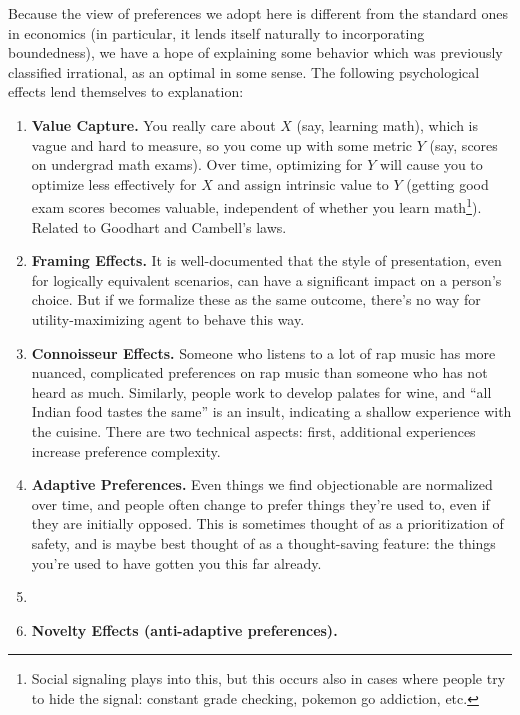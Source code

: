 \documentclass{article}
\begin{document}
	Because the view of preferences we adopt here is different from the standard ones in economics (in particular, it lends itself naturally to incorporating boundedness), we have a hope of explaining some behavior which was previously classified irrational, as an optimal in some sense. The following psychological effects lend themselves to explanation:
	\begin{enumerate}[noitemsep]
		\item \textbf{Value Capture.} You really care about $X$ (say, learning math), which is vague and hard to measure, so you come up with some metric $Y$ (say, scores on undergrad math exams). Over time, optimizing for $Y$ will cause you to optimize less effectively for $X$ and assign intrinsic value to $Y$ (getting good exam scores becomes valuable, independent of whether you learn math\footnote{Social signaling plays into this, but this occurs also in cases where people try to hide the signal: constant grade checking, pokemon go addiction, etc.}). Related to Goodhart and Cambell's laws.
		\item \textbf{Framing Effects.} It is well-documented that the style of presentation, even for logically equivalent scenarios, can have a significant impact on a person's choice. But if we formalize these as the same outcome, there's no way for utility-maximizing agent to behave this way.
		\item \textbf{Connoisseur Effects.} Someone who listens to a lot of rap music has more nuanced, complicated preferences on rap music than someone who has not heard as much. Similarly, people work to develop palates for wine, and ``all Indian food tastes the same'' is an insult, indicating a shallow experience with the cuisine. There are two technical aspects: first, additional experiences increase preference complexity.
		
		\item \textbf{Adaptive Preferences.} Even things we find objectionable are normalized over time, and people often change to prefer things they're used to, even if they are initially opposed. This is sometimes thought of as a prioritization of safety, and is maybe best thought of as a thought-saving feature: the things you're used to have gotten you this far already. 
		
		\item \textbf{}
		
		\item \textbf{Novelty Effects (anti-adaptive preferences).} 
		
	\end{enumerate}
\end{document}
